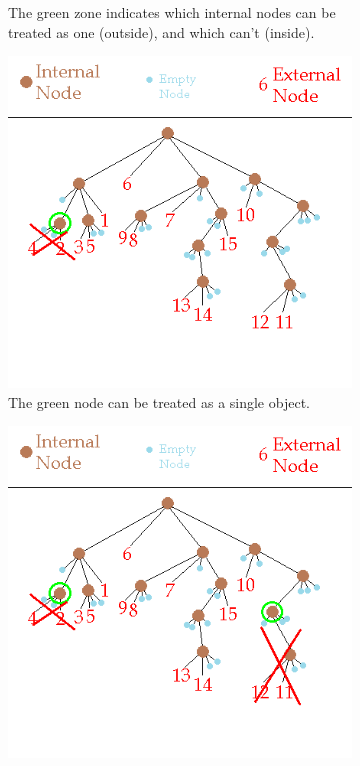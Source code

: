\begin{figure}[H]
\begin{subfigure}{0.24\textwidth}
\caption{The green zone indicates which internal nodes can be treated as one (outside), and which can't (inside).}
\end{subfigure}\hspace{1cm}
\begin{subfigure}{0.24\textwidth}
\includegraphics[width=\textwidth]{barneshut_tree_node_4_2.png}
\caption{The green node can be treated as a single object.}
\end{subfigure}\hspace{1cm}
\begin{subfigure}{0.24\textwidth}
\includegraphics[width=\textwidth]{barneshut_tree_node_lvl3.png}

\end{subfigure}
\end{figure}
